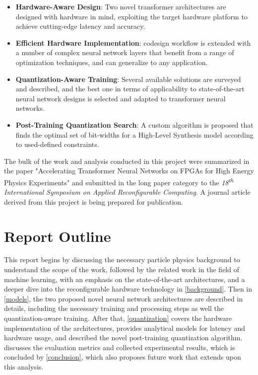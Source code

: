 \begin{itemize}
  \item \textbf{Hardware-Aware Design}: Two novel transformer architectures are designed with hardware in mind, exploiting the target hardware platform to achieve cutting-edge latency and accuracy.
  
  \item \textbf{Efficient Hardware Implementation}: \hlsml codesign workflow is extended with a number of complex neural network layers that benefit from a range of optimization techniques, and can generalize to any application.
  
  \item \textbf{Quantization-Aware Training}: Several available solutions are surveyed and described, and the best one in terms of applicability to state-of-the-art neural network designs is selected and adapted to transformer neural networks.
  
  \item \textbf{Post-Training Quantization Search}: A custom algorithm is proposed that finds the optimal set of bit-widths for a High-Level Synthesis model according to used-defined constraints.
\end{itemize}

The bulk of the work and analysis conducted in this project were summarized in the paper "Accelerating Transformer Neural Networks on FPGAs for High Energy Physics Experiments" and submitted in the long paper category to the \textit{18\textsuperscript{th} International Symposium on Applied Reconfigurable Computing}. A journal article derived from this project is being prepared for publication.

\section{Report Outline}
This report begins by discussing the necessary particle physics background to understand the scope of the work, followed by the related work in the field of machine learning, with an emphasis on the state-of-the-art architectures, and a deeper dive into the reconfigurable hardware technology in \cref{background}. Then in \cref{models}, the two proposed novel neural network architectures are described in details, including the necessary training and processing steps as well the quantization-aware training. After that, \cref{quantization} covers the hardware implementation of the architectures, provides analytical models for latency and hardware usage, and described the novel post-training quantization algorithm.  discusses the evaluation metrics and collected experimental results, which is concluded by \cref{conclusion}, which also proposes future work that extends upon this analysis.
